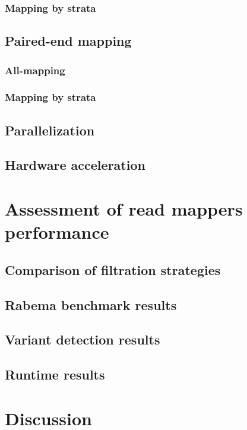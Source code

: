 \subsubsection{Mapping by strata}


\subsection{Paired-end mapping}
\subsubsection{All-mapping}
\subsubsection{Mapping by strata}


\subsection{Parallelization}
\subsection{Hardware acceleration}


\section{Assessment of read mappers performance}
\subsection{Comparison of filtration strategies}
\subsection{Rabema benchmark results}
\subsection{Variant detection results}
\subsection{Runtime results}


\section{Discussion}

